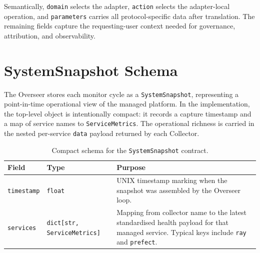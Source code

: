 \documentclass[12pt, a4paper]{report}
\begin{document}
Semantically, \texttt{domain} selects the adapter, \texttt{action} selects the
adapter-local operation, and \texttt{parameters} carries all protocol-specific data
after translation. The remaining fields capture the requesting-user context needed
for governance, attribution, and observability.

\section{SystemSnapshot Schema}
\label{app:snapshot}

The Overseer stores each monitor cycle as a \texttt{SystemSnapshot}, representing a
point-in-time operational view of the managed platform. In the implementation, the
top-level object is intentionally compact: it records a capture timestamp and a map
of service names to \texttt{ServiceMetrics}. The operational richness is carried in
the nested per-service \texttt{data} payload returned by each Collector.

\begin{table}[H]
  \centering
  \caption{Compact schema for the \texttt{SystemSnapshot} contract.}
  \label{tab:systemsnapshot_schema}
  \begin{tabularx}{\textwidth}{l l X}
    \toprule
    \textbf{Field} & \textbf{Type} & \textbf{Purpose} \\
    \midrule
    \texttt{timestamp} & \texttt{float} & UNIX timestamp marking when the snapshot was assembled by the Overseer loop. \\
    \addlinespace
    \texttt{services} & \texttt{dict[str, ServiceMetrics]} & Mapping from collector name to the latest standardised health payload for that managed service. Typical keys include \texttt{ray} and \texttt{prefect}. \\
    \bottomrule
  \end{tabularx}
\end{table}
\end{document}
